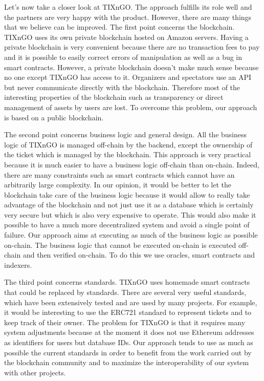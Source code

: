 \documentclass[a4paper,11pt,oneside]{report}
\begin{document}
Let's now take a closer look at TIXnGO. The approach fulfills its role well and the partners are very happy with the product. However, there are many things that we believe can be improved. The first point concerns the blockchain. TIXnGO uses its own private blockchain hosted on Amazon servers. Having a private blockchain is very convenient because there are no transaction fees to pay and it is possible to easily correct errors of manipulation as well as a bug in smart contracts. However, a private blockchain doesn't make much sense because no one except TIXnGO has access to it. Organizers and spectators use an API but never communicate directly with the blockchain. Therefore most of the interesting properties of the blockchain such as transparency or direct management of assets by users are lost. To overcome this problem, our approach is based on a public blockchain.

The second point concerns business logic and general design. All the business logic of TIXnGO is managed off-chain by the backend, except the ownership of the ticket which is managed by the blockchain. This approach is very practical because it is much easier to have a business logic off-chain than on-chain. Indeed, there are many constraints such as smart contracts which cannot have an arbitrarily large complexity. In our opinion, it would be better to let the blockchain take care of the business logic because it would allow to really take advantage of the blockchain and not just use it as a database which is certainly very secure but which is also very expensive to operate. This would also make it possible to have a much more decentralized system and avoid a single point of failure. Our approach aims at executing as much of the business logic as possible on-chain. The business logic that cannot be executed on-chain is executed off-chain and then verified on-chain. To do this we use oracles, smart contracts and indexers.

The third point concerns standards. TIXnGO uses homemade smart contracts that could be replaced by standards. There are several very useful standards, which have been extensively tested and are used by many projects. For example, it would be interesting to use the ERC721 standard to represent tickets and to keep track of their owner. The problem for TIXnGO is that it requires many system adjustments because at the moment it does not use Ethereum addresses as identifiers for users but database IDs. Our approach tends to use as much as possible the current standards in order to benefit from the work carried out by the blockchain community and to maximize the interoperability of our system with other projects.
\end{document}
